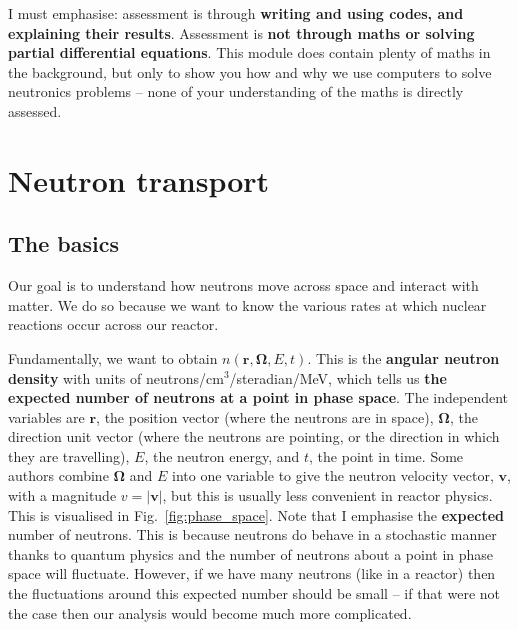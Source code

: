 \documentclass{article}
\begin{document}
I must emphasise: assessment is through \textbf{writing and using codes, and explaining their results}. Assessment is \textbf{not through maths or solving partial differential equations}. This module does contain plenty of maths in the background, but only to show you how and why we use computers to solve neutronics problems -- none of your understanding of the maths is directly assessed.

\section{Neutron transport}

\subsection{The basics}
Our goal is to understand how neutrons move across space and interact with matter. We do so because we want to know the various rates at which nuclear reactions occur across our reactor.

Fundamentally, we want to obtain $n(\mathbf{r},\mathbf{\Omega},E,t)$. This is the \textbf{angular neutron density} with units of neutrons/cm$^3$/steradian/MeV, which tells us \textbf{the expected number of neutrons at a point in phase space}. The independent variables are $\mathbf{r}$, the position vector (where the neutrons are in space), $\mathbf{\Omega}$, the direction unit vector (where the neutrons are pointing, or the direction in which they are travelling), $E$, the neutron energy, and $t$, the point in time. Some authors combine $\mathbf{\Omega}$ and $E$ into one variable to give the neutron velocity vector, $\mathbf{v}$, with a magnitude $v = |\mathbf{v}|$, but this is usually less convenient in reactor physics. This is visualised in Fig.~\ref{fig:phase_space}. Note that I emphasise the \textbf{expected} number of neutrons. This is because neutrons do behave in a stochastic manner thanks to quantum physics and the number of neutrons about a point in phase space will fluctuate. However, if we have many neutrons (like in a reactor) then the fluctuations around this expected number should be small -- if that were not the case then our analysis would become much more complicated.
\end{document}
